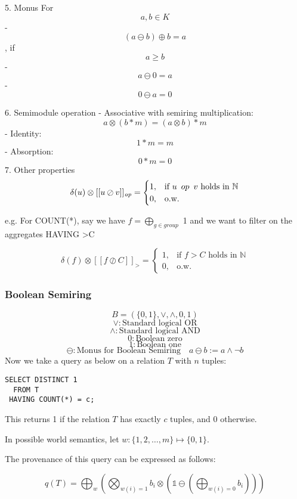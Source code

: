 \documentclass[10pt,a4paper]{scrartcl}
\theoremstyle{definition}
\theoremstyle{remark}
\begin{document}
5. Monus \newline
For $$a, b \in K$$
- $$(a \ominus b) \oplus b =a$$, if $$a \geq b$$
- $$a \ominus 0 =a$$
- $$0 \ominus a = 0$$

6. Semimodule operation
- Associative with semiring multiplication: $$a \otimes (b * m)= (a \otimes b) * m$$
- Identity: $$1*m=m$$
- Absorption: $$0*m=0$$
7. Other properties
$$
 \delta(u)\otimes[[u \oslash   v]]_{\mathit{op}}=\begin{cases}1, & \text{if } u\hspace{0.5em} op\hspace{0.5em} v \text{ holds in } \mathbb{N} \\
0,&\text{o.w.}\end{cases}
$$

e.g. For COUNT(*), say we have $f=\bigoplus_{g \in group}$ 1 and we want to filter on the aggregates HAVING >C

$$
 \delta(f)\otimes[[f \oslash   C]]_{\mathit{>}}=\begin{cases}1, & \text{if } f>C \text{ holds in } \mathbb{N} \\
0,&\text{o.w.}\end{cases}
$$

\subsubsection{Boolean Semiring}
$$B = (\{0,1\}, \lor, \land, 0, 1)$$
$$\lor : \text{Standard logical OR}$$
$$\land : \text{Standard logical AND}$$
$$0 : \text{Boolean zero}$$
$$1 : \text{Boolean one}$$
\[
\ominus: \text{Monus for Boolean Semiring} \quad a \ominus b := a \land \neg b
\]
Now we take a query as below on a relation $T$ with $n$ tuples:

\begin{listing}[ht]
\begin{verbatim}
SELECT DISTINCT 1
  FROM T
 HAVING COUNT(*) = c;
\end{verbatim}
\end{listing}

This returns 1 if the relation $T$ has exactly $c$ tuples, and 0 otherwise.

In possible world semantics, let $w: \{1,2,\dots,m\} \mapsto \{0,1\}$.

The provenance of this query can be expressed as follows:

$$q(T) = \bigoplus_{w}\left(\bigotimes_{w(i)=1}b_i\otimes\left(\mathbb{1}\ominus(\bigoplus_{w(i) =0}b_i)\right)\right)$$
\end{document}
